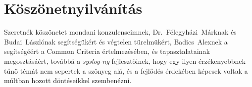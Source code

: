 \chapter*{Köszönetnyilvánítás}

Szeretnék köszönetet mondani konzulenseimnek, \mbox{Dr. Félegyházi Márknak} és \mbox{Budai
Lászlónak} segítségükért és végtelen türelmükért, \mbox{Badics Alexnek} a segítségéért a Common
Criteria értelmezésében, és tapasztalatainak megosztásáért, továbbá a \emph{syslog-ng}
fejlesztőinek, hogy egy ilyen érzékenyebbnek tűnő témát nem sepertek a szőnyeg alá, és a fejlődés
érdekében képesek voltak a múltban hozott döntéseikkel szembenézni.
